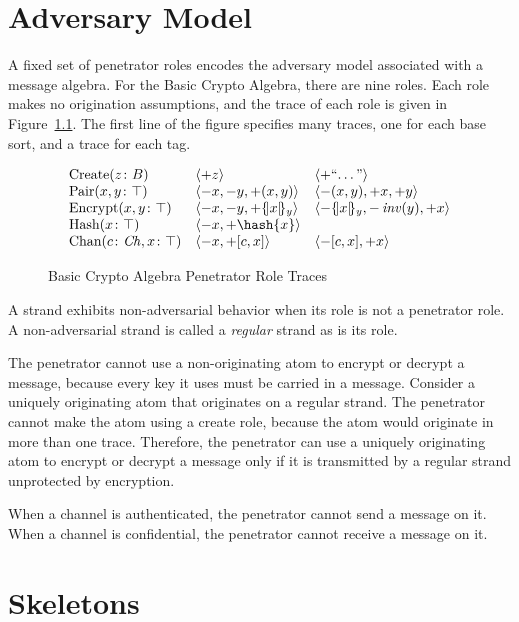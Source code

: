 \documentclass[12pt]{report}
\theoremstyle{definition}
\begin{document}
\chapter{Adversary Model}\label{chp:adversary model}

A fixed set of penetrator roles encodes the adversary model associated
with a message algebra.  For the Basic Crypto Algebra, there are nine
roles.  Each role makes no origination assumptions, and the trace of
each role is given in Figure~\ref{fig:pen}.  The first line of the
figure specifies many traces, one for each base sort, and a trace for
each tag.

\begin{figure}
$$\begin{array}{lll}
\mbox{Create}(z\colon B)&
\seq{\outbnd z}&\seq{\outbnd\mbox{``\ldots''}}\\
\mbox{Pair}(x,y\colon\top)&
\seq{\inbnd x,\inbnd y,\outbnd(x, y)}&
\seq{\inbnd(x, y),\outbnd x,\outbnd y}\\
\mbox{Encrypt}(x,y\colon\top)&
\seq{\inbnd x,\inbnd y,\outbnd\enc{x}{y}}&
\seq{\inbnd\enc{x}{y},\inbnd \fn{inv}(y),\outbnd x}\\
\mbox{Hash}(x\colon\top)&
\seq{\inbnd x,\outbnd\hash{x}}\\
\mbox{Chan}(c\colon\mathit{Ch},x\colon\top)
&\seq{\inbnd x, \outbnd[c,x]}&\seq{\inbnd[c,x],\outbnd x}
\end{array}$$
\caption{Basic Crypto Algebra Penetrator Role Traces}\label{fig:pen}
\end{figure}

A strand exhibits non-adversarial behavior when its role is not a
penetrator role.  A non-adversarial strand is called a \emph{regular} strand as is its role.

The penetrator cannot use a non-originating atom to encrypt or decrypt
a message, because every key it uses must be carried in a message.
Consider a uniquely originating atom that originates on a regular
strand.  The penetrator cannot make the atom using a create role,
because the atom would originate in more than one trace.  Therefore,
the penetrator can use a uniquely originating atom to encrypt or
decrypt a message only if it is transmitted by a regular strand
unprotected by encryption.

When a channel is authenticated, the penetrator cannot send a message
on it.  When a channel is confidential, the penetrator cannot receive
a message on it.

\chapter{Skeletons}\label{chp:skeletons}
\end{document}
